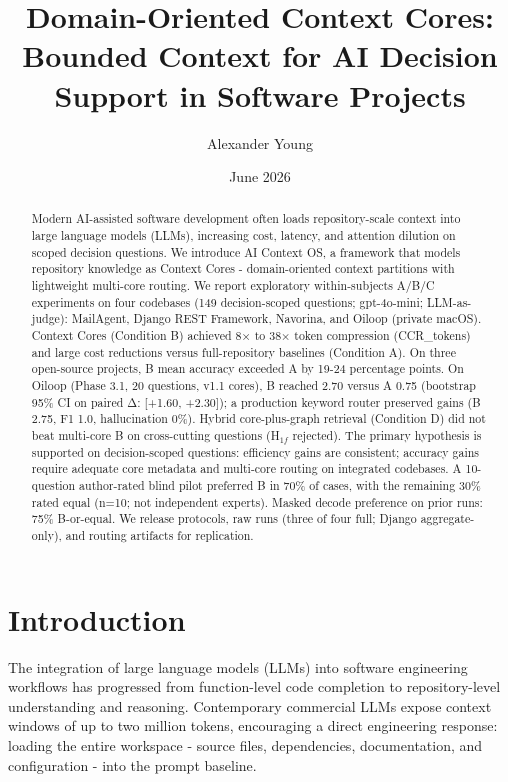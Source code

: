 \documentclass[11pt]{article}
\title{Domain-Oriented Context Cores: Bounded Context for AI Decision
Support in Software Projects}
\author{Alexander Young}
\date{June 2026}
\begin{document}
\maketitle

\begin{abstract}
Modern AI-assisted software development often loads repository-scale
context into large language models (LLMs), increasing cost, latency, and
attention dilution on scoped decision questions. We introduce AI Context
OS, a framework that models repository knowledge as Context Cores -
domain-oriented context partitions with lightweight multi-core routing.
We report exploratory within-subjects A/B/C experiments on four
codebases (149 decision-scoped questions; gpt-4o-mini; LLM-as-judge):
MailAgent, Django REST Framework, Navorina, and Oiloop (private macOS).
Context Cores (Condition B) achieved 8× to 38× token compression
(CCR\_tokens) and large cost reductions versus full-repository baselines
(Condition A). On three open-source projects, B mean accuracy exceeded A
by 19-24 percentage points. On Oiloop (Phase 3.1, 20 questions, v1.1
cores), B reached 2.70 versus A 0.75 (bootstrap 95\% CI on paired Δ:
{[}+1.60, +2.30{]}); a production keyword router preserved gains (B
2.75, F1 1.0, hallucination 0\%). Hybrid core-plus-graph retrieval
(Condition D) did not beat multi-core B on cross-cutting questions
(H\(_{1f}\) rejected). The primary hypothesis is supported on
decision-scoped questions: efficiency gains are consistent; accuracy
gains require adequate core metadata and multi-core routing on
integrated codebases. A 10-question author-rated blind pilot preferred B
in 70\% of cases, with the remaining 30\% rated equal (n=10; not
independent experts). Masked decode preference on prior runs: 75\%
B-or-equal. We release protocols, raw runs (three of four full; Django
aggregate-only), and routing artifacts for replication.
\end{abstract}


\section{Introduction}\label{introduction}

The integration of large language models (LLMs) into software
engineering workflows has progressed from function-level code completion
to repository-level understanding and reasoning. Contemporary commercial
LLMs expose context windows of up to two million tokens, encouraging a
direct engineering response: loading the entire workspace - source
files, dependencies, documentation, and configuration - into the prompt
baseline.
\end{document}
